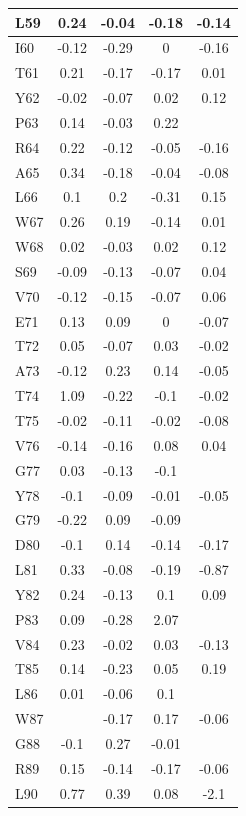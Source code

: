 \documentclass[%
 aip,
 amsmath,amssymb,
 preprint,%
]{revtex4-1}
\begin{document}
\begin{center}
\begin{longtable}{l|c|c|c|c}
L59 & 0.24 & -0.04 & -0.18 & -0.14 \\\hline
I60 & -0.12 & -0.29 & 0 & -0.16 \\\hline
T61 & 0.21 & -0.17 & -0.17 & 0.01 \\\hline
Y62 & -0.02 & -0.07 & 0.02 & 0.12 \\\hline
P63 & 0.14 & -0.03 & 0.22 & \\\hline
R64 & 0.22 & -0.12 & -0.05 & -0.16 \\\hline
A65 & 0.34 & -0.18 & -0.04 & -0.08 \\\hline
L66 & 0.1 & 0.2 & -0.31 & 0.15 \\\hline
W67 & 0.26 & 0.19 & -0.14 & 0.01 \\\hline
W68 & 0.02 & -0.03 & 0.02 & 0.12 \\\hline
S69 & -0.09 & -0.13 & -0.07 & 0.04 \\\hline
V70 & -0.12 & -0.15 & -0.07 & 0.06 \\\hline
E71 & 0.13 & 0.09 & 0 & -0.07 \\\hline
T72 & 0.05 & -0.07 & 0.03 & -0.02 \\\hline
A73 & -0.12 & 0.23 & 0.14 & -0.05 \\\hline
T74 & 1.09 & -0.22 & -0.1 & -0.02 \\\hline
T75 & -0.02 & -0.11 & -0.02 & -0.08 \\\hline
V76 & -0.14 & -0.16 & 0.08 & 0.04 \\\hline
G77 & 0.03 & -0.13 & -0.1 & \\\hline
Y78 & -0.1 & -0.09 & -0.01 & -0.05 \\\hline
G79 & -0.22 & 0.09 & -0.09 & \\\hline
D80 & -0.1 & 0.14 & -0.14 & -0.17 \\\hline
L81 & 0.33 & -0.08 & -0.19 & -0.87 \\\hline
Y82 & 0.24 & -0.13 & 0.1 & 0.09 \\\hline
P83 & 0.09 & -0.28 & 2.07 & \\\hline
V84 & 0.23 & -0.02 & 0.03 & -0.13 \\\hline
T85 & 0.14 & -0.23 & 0.05 & 0.19 \\\hline
L86 & 0.01 & -0.06 & 0.1 & \\\hline
W87 & & -0.17 & 0.17 & -0.06 \\\hline
G88 & -0.1 & 0.27 & -0.01 & \\\hline
R89 & 0.15 & -0.14 & -0.17 & -0.06 \\\hline
L90 & 0.77 & 0.39 & 0.08 & -2.1 \\\hline

\end{longtable}
\end{center}
\end{document}
